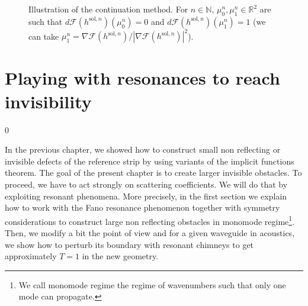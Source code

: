 \documentclass[11pt,a4paper]{report}
\newcommand{\eps}{\varepsilon}
\newcommand{\mrm}[1]{\mathrm{#1}}
\newcommand{\N}{\mathbb{N}}
\newcommand{\R}{\mathbb{R}}
\begin{document}
\begin{figure}[!ht]
\centering
{}
\caption{Illustration of the continuation method. For $n\in\N$, $\mu^{n}_0,\mu^{n}_1\in\R^2$ are such that $d\mathscr{F}(h^{\mrm{sol},n})(\mu^{n}_0)=0$ and $d\mathscr{F}(h^{\mrm{sol},n})(\mu^{n}_1)=1$ (we can take $\mu^{n}_1=\nabla\mathscr{F}(h^{\mrm{sol},n})/|\nabla\mathscr{F}(h^{\mrm{sol},n})|^2$). \label{FigContMeth}} 
\end{figure}



\chapter{Playing with resonances to reach invisibility}\label{SectionResonance}
\setcounter {section} {0}


\noindent In the previous chapter, we showed how to construct small non reflecting or invisible defects of the reference strip by using variants of the implicit functions theorem. The goal of the present chapter is to create larger invisible obstacles. To proceed, we have to act strongly on scattering coefficients. We will do that by exploiting resonant phenomena. More precisely, in the first section we explain how to work with the Fano resonance phenomenon together with symmetry considerations to construct large non reflecting obstacles in monomode regime\footnote{We call monomode regime the regime of wavenumbers such that only one mode can propagate.}. Then, we modify a bit the point of view and for a given waveguide in acoustics, we show how to perturb its boundary with resonant chimneys to get approximately $T=1$ in the new geometry.
\end{document}
